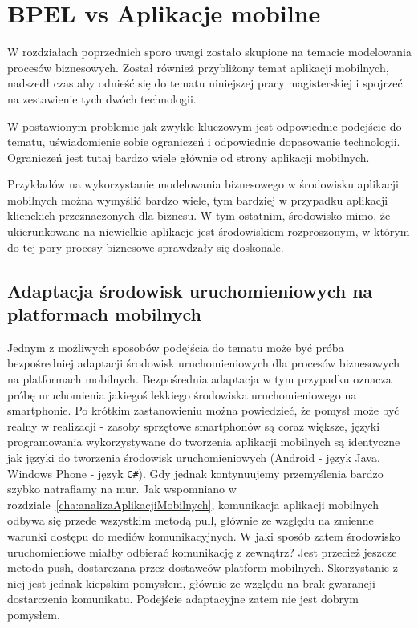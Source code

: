 \chapter{BPEL vs Aplikacje mobilne}
\label{cha:bpelVSmobileApp}
W rozdziałach poprzednich sporo uwagi zostało skupione na temacie modelowania procesów biznesowych. Został również przybliżony temat aplikacji mobilnych, nadszedł czas aby odnieść się do tematu niniejszej pracy magisterskiej i spojrzeć na zestawienie  tych dwóch technologii. 

W postawionym problemie jak zwykle kluczowym jest odpowiednie podejście do tematu, uświadomienie sobie ograniczeń i odpowiednie dopasowanie technologii. Ograniczeń jest tutaj bardzo wiele głównie od strony aplikacji mobilnych.

 Przykładów na wykorzystanie modelowania biznesowego w środowisku aplikacji mobilnych można wymyślić bardzo wiele, tym bardziej w przypadku aplikacji klienckich przeznaczonych dla biznesu. W tym ostatnim, środowisko mimo, że ukierunkowane na niewielkie aplikacje jest środowiskiem rozproszonym, w którym do tej pory procesy biznesowe sprawdzały się doskonale. 

\section{Adaptacja środowisk uruchomieniowych na platformach mobilnych}
\label{sec:adaptacjaProcesówNaPlatformyMobilne}
Jednym z możliwych sposobów podejścia do tematu może być próba bezpośredniej adaptacji środowisk uruchomieniowych dla procesów biznesowych na platformach mobilnych. Bezpośrednia adaptacja w tym przypadku oznacza próbę uruchomienia jakiegoś lekkiego środowiska uruchomieniowego na smartphonie. Po krótkim zastanowieniu można powiedzieć, że pomysł może być realny w realizacji - zasoby sprzętowe smartphonów są coraz większe, języki programowania wykorzystywane do tworzenia aplikacji mobilnych są identyczne jak języki do tworzenia środowisk uruchomieniowych (Android - język Java, Windows Phone - język \texttt{C\#}). Gdy jednak kontynuujemy przemyślenia bardzo szybko natrafiamy na mur. Jak wspomniano w rozdziale~\ref{cha:analizaAplikacjiMobilnych}, komunikacja aplikacji mobilnych odbywa się przede wszystkim metodą pull, głównie ze względu na zmienne warunki dostępu do mediów komunikacyjnych. W jaki sposób zatem środowisko uruchomieniowe miałby odbierać komunikację z zewnątrz? Jest przecież jeszcze metoda push, dostarczana przez dostawców platform mobilnych. Skorzystanie z niej jest jednak kiepskim pomysłem, głównie ze względu na brak gwarancji dostarczenia komunikatu. Podejście adaptacyjne zatem nie jest dobrym pomysłem. 

